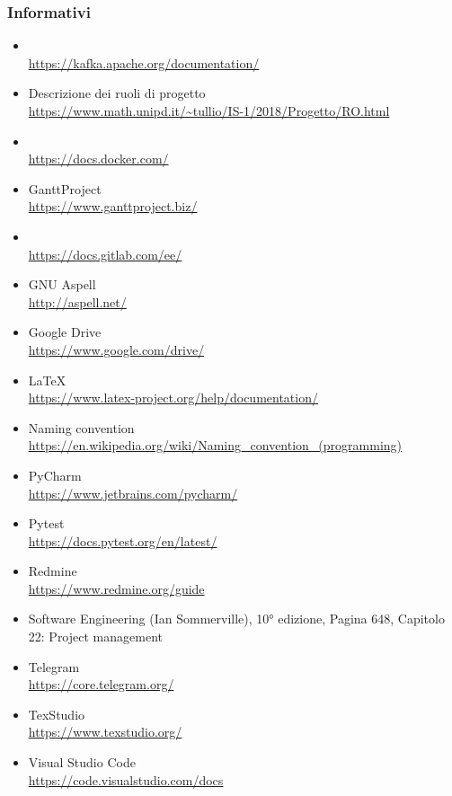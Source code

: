     \subsubsection{Informativi}	\label{rifinfo}
    \begin{itemize}
		\item {} \\\url{https://kafka.apache.org/documentation/}
        \item Descrizione dei ruoli di progetto \\\url{https://www.math.unipd.it/~tullio/IS-1/2018/Progetto/RO.html}
		\item {} \\\url{https://docs.docker.com/}
        \item GanttProject \\\url{https://www.ganttproject.biz/}
		\item {} \\\url{https://docs.gitlab.com/ee/}
		\item GNU Aspell \\\url{http://aspell.net/}
        \item Google Drive \\\url{https://www.google.com/drive/}
		\item \LaTeX\ \\\url{https://www.latex-project.org/help/documentation/}
        \item Naming convention \\\url{https://en.wikipedia.org/wiki/Naming_convention_(programming)}
        \item PyCharm \\\url{https://www.jetbrains.com/pycharm/}
		\item Pytest \\\url{https://docs.pytest.org/en/latest/}
		\item Redmine \\\url{https://www.redmine.org/guide}
        \item Software Engineering (Ian Sommerville), 10° edizione,
        Pagina 648, Capitolo 22: Project management
		\item Telegram \\\url{https://core.telegram.org/}
        \item TexStudio \\\url{https://www.texstudio.org/}
        \item Visual Studio Code \\\url{https://code.visualstudio.com/docs}
	\end{itemize}
